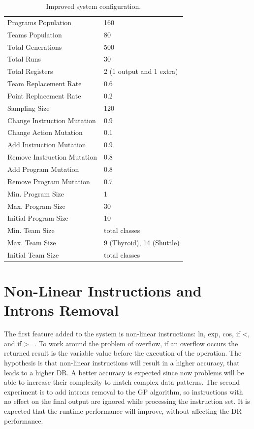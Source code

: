 \documentclass[journal]{IEEEtran}
\begin{document}
\begin{table}[h]
\centering
\captionsetup{justification=centering}
\begin{tabular}{@{}ll@{}}
\toprule
Programs Population & 160 \\
Teams Population    & 80 \\
Total Generations   & 500 \\
Total Runs          & 30 \\
Total Registers          & 2 (1 output and 1 extra) \\
Team Replacement Rate          & 0.6 \\
Point Replacement Rate          & 0.2 \\
Sampling Size          & 120 \\
\midrule
Change Instruction Mutation          & 0.9 \\
Change Action Mutation          & 0.1 \\
Add Instruction Mutation          & 0.9 \\
Remove Instruction Mutation          & 0.8 \\
Add Program Mutation          & 0.8 \\
Remove Program Mutation          & 0.7 \\
\midrule
Min. Program Size          & 	1 \\
Max. Program Size          & 30 \\
Initial Program Size          & 10 \\
\midrule
Min. Team Size          &  total classes \\
Max. Team Size          & 9 (Thyroid), 14 (Shuttle) \\
Initial Team Size          & total classes \\
\bottomrule
\end{tabular}
\caption{Improved system configuration.}
\label{table:improved_config}
\end{table}

\section{Non-Linear Instructions and Introns Removal}
The first feature added to the system is non-linear instructions: ln, exp, cos, if <, and if >=. To work around the problem of overflow, if an overflow occurs the returned result is the variable value before the execution of the operation. The hypothesis is that non-linear instructions will result in a higher accuracy, that leads to a higher DR.  A better accuracy is expected since now problems will be able to increase their complexity to match complex data patterns. The second experiment is to add introns removal to the GP algorithm, so instructions with no effect on the final output are ignored while processing the instruction set. It is expected that the runtime performance will improve, without affecting the DR performance.
\end{document}
